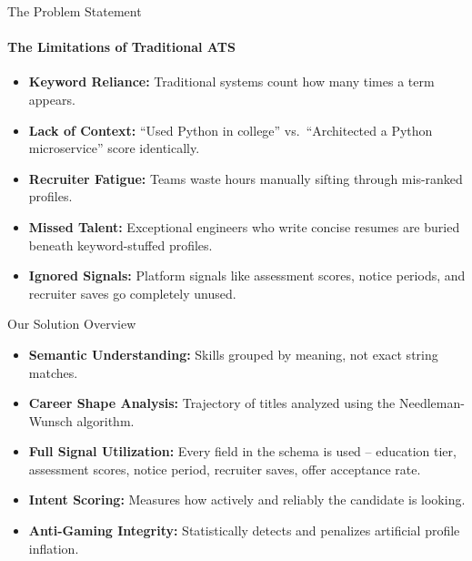 \documentclass[aspectratio=169]{beamer}
\begin{document}
\begin{frame}{The Problem Statement}
  \framesubtitle{The Limitations of Traditional ATS}
  \begin{itemize}
    \item \textbf{Keyword Reliance:} Traditional systems count how many times a term appears.
    \item \textbf{Lack of Context:} ``Used Python in college'' vs.\ ``Architected a Python microservice'' score identically.
    \item \textbf{Recruiter Fatigue:} Teams waste hours manually sifting through mis-ranked profiles.
    \item \textbf{Missed Talent:} Exceptional engineers who write concise resumes are buried beneath keyword-stuffed profiles.
    \item \textbf{Ignored Signals:} Platform signals like assessment scores, notice periods, and recruiter saves go completely unused.
  \end{itemize}
\end{frame}

\begin{frame}{Our Solution Overview}
  \begin{itemize}
    \item \textbf{Semantic Understanding:} Skills grouped by meaning, not exact string matches.
    \item \textbf{Career Shape Analysis:} Trajectory of titles analyzed using the Needleman-Wunsch algorithm.
    \item \textbf{Full Signal Utilization:} Every field in the schema is used -- education tier, assessment scores, notice period, recruiter saves, offer acceptance rate.
    \item \textbf{Intent Scoring:} Measures how actively and reliably the candidate is looking.
    \item \textbf{Anti-Gaming Integrity:} Statistically detects and penalizes artificial profile inflation.
  \end{itemize}
\end{frame}
\end{document}
